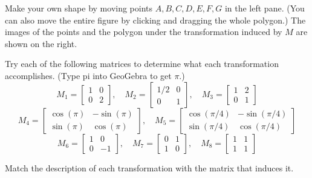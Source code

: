 \documentclass{ximera}
\begin{document}
\begin{exploration}\label{exp:shapeTransformation}
Make your own shape by moving points $A, B, C, D, E, F, G$ in the left pane.  (You can also move the entire figure by clicking and dragging the whole polygon.)  The images of the points and the polygon under the transformation induced by $M$ are shown on the right.


\begin{onlineOnly}
\begin{center}
\end{center}
\end{onlineOnly}

Try each of the following matrices to determine what each transformation accomplishes.  (Type pi into GeoGebra to get $\pi$.)
$$M_1=\begin{bmatrix}1&0\\0&2\end{bmatrix},\quad M_2=\begin{bmatrix}1/2&0\\0&1\end{bmatrix},\quad M_3=\begin{bmatrix}1&2\\0&1\end{bmatrix}$$
$$M_4=\begin{bmatrix}\cos(\pi)&-\sin(\pi)\\\sin(\pi)&\cos(\pi)\end{bmatrix},\quad M_5=\begin{bmatrix}\cos\left(\pi/4\right)&-\sin\left(\pi/4\right)\\\sin\left(\pi/4\right)&\cos\left(\pi/4\right)\end{bmatrix}$$
$$M_6=\begin{bmatrix}1&0\\0&-1\end{bmatrix},\quad M_7=\begin{bmatrix}0&1\\1&0\end{bmatrix},\quad M_8=\begin{bmatrix}1&1\\1&1\end{bmatrix}$$

Match the description of each transformation with the matrix that induces it.


\end{exploration}
\end{document}
